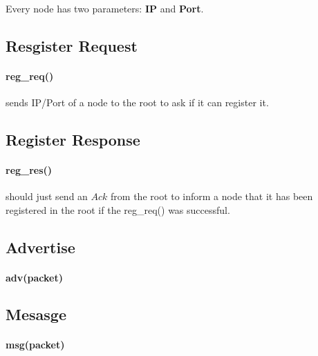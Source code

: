 \documentclass{article}
\begin{document}
\paragraph{}Every node has two parameters: \textbf{IP} and \textbf{Port}.
\subsection{Resgister Request}
\paragraph{reg\_req()} sends IP/Port of a node to the root to ask if it can register it.
\subsection{Register Response}
\paragraph{reg\_res()} should just send an $Ack$ from the root  to inform a node that it has been registered in the root if the reg\_req() was successful.
\subsection{Advertise}
\paragraph{adv(packet)}
\subsection{Mesasge}
\paragraph{msg(packet)}
\clearpage
\end{document}
